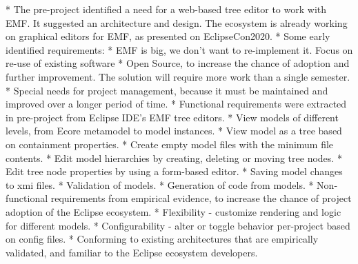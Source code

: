 * The pre-project identified a need for a web-based tree editor to work with EMF. It suggested an architecture and design. The ecosystem is already working on graphical editors for EMF, as presented on EclipseCon2020.
  * Some early identified requirements:
    * EMF is big, we don't want to re-implement it. Focus on re-use of existing software
    * Open Source, to increase the chance of adoption and further improvement. The solution will require more work than a single semester.
    * Special needs for project management, because it must be maintained and improved over a longer period of time.
  * Functional requirements were extracted in pre-project from Eclipse IDE's EMF tree editors.
    * View models of different levels, from Ecore metamodel to model instances.
    * View model as a tree based on containment properties.
    * Create empty model files with the minimum file contents.
    * Edit model hierarchies by creating, deleting or moving tree nodes.
    * Edit tree node properties by using a form-based editor.
    * Saving model changes to xmi files.
    * Validation of models.
    * Generation of code from models.
  * Non-functional requirements from empirical evidence, to increase the chance of project adoption of the Eclipse ecosystem.
    * Flexibility - customize rendering and logic for different models.
    * Configurability - alter or toggle behavior per-project based on config files.
    * Conforming to existing architectures that are empirically validated, and familiar to the Eclipse ecosystem developers.